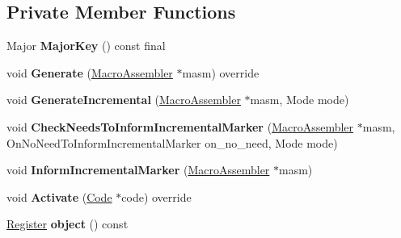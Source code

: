\subsection*{Private Member Functions}
\begin{DoxyCompactItemize}
\item 
Major {\bfseries Major\+Key} () const  final\hypertarget{classv8_1_1internal_1_1_record_write_stub_aa48ea86c84fbc9af6c238be1b4b8fa8d}{}\label{classv8_1_1internal_1_1_record_write_stub_aa48ea86c84fbc9af6c238be1b4b8fa8d}

\item 
void {\bfseries Generate} (\hyperlink{classv8_1_1internal_1_1_macro_assembler}{Macro\+Assembler} $\ast$masm) override\hypertarget{classv8_1_1internal_1_1_record_write_stub_a71cb55552be288a12876045441a66dca}{}\label{classv8_1_1internal_1_1_record_write_stub_a71cb55552be288a12876045441a66dca}

\item 
void {\bfseries Generate\+Incremental} (\hyperlink{classv8_1_1internal_1_1_macro_assembler}{Macro\+Assembler} $\ast$masm, Mode mode)\hypertarget{classv8_1_1internal_1_1_record_write_stub_a05cf08ed0350334ba02a2e918b42ffcc}{}\label{classv8_1_1internal_1_1_record_write_stub_a05cf08ed0350334ba02a2e918b42ffcc}

\item 
void {\bfseries Check\+Needs\+To\+Inform\+Incremental\+Marker} (\hyperlink{classv8_1_1internal_1_1_macro_assembler}{Macro\+Assembler} $\ast$masm, On\+No\+Need\+To\+Inform\+Incremental\+Marker on\+\_\+no\+\_\+need, Mode mode)\hypertarget{classv8_1_1internal_1_1_record_write_stub_aa80cd82bd6fa0cdc17b5cb2d17540d59}{}\label{classv8_1_1internal_1_1_record_write_stub_aa80cd82bd6fa0cdc17b5cb2d17540d59}

\item 
void {\bfseries Inform\+Incremental\+Marker} (\hyperlink{classv8_1_1internal_1_1_macro_assembler}{Macro\+Assembler} $\ast$masm)\hypertarget{classv8_1_1internal_1_1_record_write_stub_a18e17a353df1617947581e3e6b9e9183}{}\label{classv8_1_1internal_1_1_record_write_stub_a18e17a353df1617947581e3e6b9e9183}

\item 
void {\bfseries Activate} (\hyperlink{classv8_1_1internal_1_1_code}{Code} $\ast$code) override\hypertarget{classv8_1_1internal_1_1_record_write_stub_aee832e64590d152a601ed41c5e4fdac9}{}\label{classv8_1_1internal_1_1_record_write_stub_aee832e64590d152a601ed41c5e4fdac9}

\item 
\hyperlink{structv8_1_1internal_1_1_register}{Register} {\bfseries object} () const \hypertarget{classv8_1_1internal_1_1_record_write_stub_a6d3a7affc9526b332c46fbe8f54f0b19}{}\label{classv8_1_1internal_1_1_record_write_stub_a6d3a7affc9526b332c46fbe8f54f0b19}


\end{DoxyCompactItemize}
